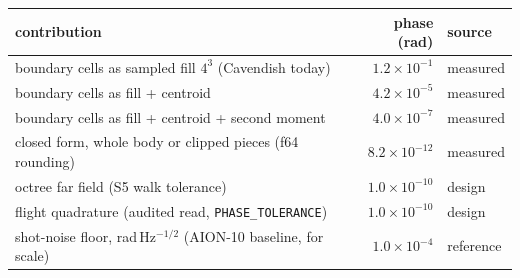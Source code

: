 \begin{tabular}{lrl}
\toprule
contribution & phase (rad) & source \\
\midrule
boundary cells as sampled fill $4^3$ (Cavendish today) & $1.2\times10^{-1}$ & measured \\
boundary cells as fill + centroid & $4.2\times10^{-5}$ & measured \\
boundary cells as fill + centroid + second moment & $4.0\times10^{-7}$ & measured \\
closed form, whole body or clipped pieces (f64 rounding) & $8.2\times10^{-12}$ & measured \\
octree far field (S5 walk tolerance) & $1.0\times10^{-10}$ & design \\
flight quadrature (audited read, \texttt{PHASE\_TOLERANCE}) & $1.0\times10^{-10}$ & design \\
shot-noise floor, rad\,Hz$^{-1/2}$ (AION-10 baseline, for scale) & $1.0\times10^{-4}$ & reference \\
\bottomrule
\end{tabular}
